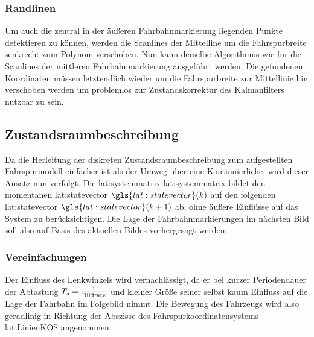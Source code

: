\subsubsection{Randlinen}
Um auch die zentral in der äußeren Fahrbahnmarkierung liegenden Punkte detektieren zu können, werden die Scanlines der Mittelline um die Fahrspurbreite senkrecht zum Polynom verschoben. Nun kann derselbe Algorithmus wie für die Scanlines der mittleren Fahrbahnmarkierung ausgeführt werden. Die gefundenen Koordinaten müssen letztendlich wieder um die Fahrspurbreite zur Mittellinie hin verschoben werden um problemlos zur Zustandskorrektur des Kalmanfilters nutzbar zu sein.
 
\subsection{Zustandsraumbeschreibung}
Da die Herleitung der diskreten Zustandsraumbeschreibung zum aufgestellten Fahrspurmodell einfacher ist als der Umweg über eine Kontinuierliche, wird dieser Ansatz nun verfolgt.
Die \glsdesc{lat:systemmatrix} \gls{lat:systemmatrix} bildet den momentanen \glsdesc{lat:statevector} \(\gls{lat:statevector}(\scl{k})\) auf den folgenden \glsdesc{lat:statevector} \(\gls{lat:statevector}(\scl{k}+1)\) ab, ohne äußere Einflüsse auf das System zu berücksichtigen. Die Lage der Fahrbahnmarkierungen im nächsten Bild soll also auf Basis des aktuellen Bildes vorhergesagt werden.

\subsubsection{Vereinfachungen}
Der Einfluss des Lenkwinkels wird vernachlässigt, da er bei kurzer Periodendauer der Abtastung \(T_s = \frac{1}{\text{Bildrate}}\) und kleiner Größe seiner selbst kaum Einfluss auf die Lage der Fahrbahn im Folgebild nimmt. Die Bewegung des Fahrzeugs wird also geradlinig in Richtung der Abszisse des Fahrspurkoordinatensystems \gls{lat:LinienKOS} angenommen. 

